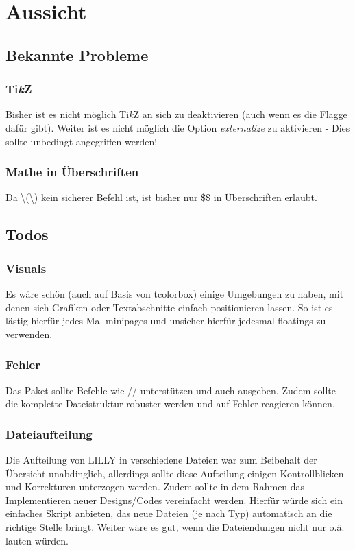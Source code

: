 \chapter{Aussicht}
\section{Bekannte Probleme}
\subsection{Ti\emph{k}Z}
Bisher ist es nicht möglich Ti\emph{k}Z an sich zu deaktivieren (auch wenn es die Flagge dafür gibt). \textcolor{Awesome}{Weiter ist es nicht möglich die Option \emph{externalize} zu aktivieren} - Dies sollte unbedingt angegriffen werden!
\subsection{Mathe in Überschriften}
Da \dq\textbackslash(\textbackslash)\dq{} kein sicherer Befehl ist, ist bisher nur \dq\$\$\dq{} in Überschriften erlaubt.
\section{Todos}
\subsection{Visuals}
Es wäre schön (auch auf Basis von tcolorbox) einige Umgebungen zu haben, mit denen sich Grafiken oder Textabschnitte einfach positionieren lassen. So ist es lästig hierfür jedes Mal minipages und unsicher hierfür jedesmal floatings zu verwenden.
\subsection{Fehler}
Das Paket sollte Befehle wie // unterstützen und auch ausgeben. Zudem sollte die komplette Dateistruktur robuster werden und auf Fehler reagieren können.
\subsection{Dateiaufteilung}
Die Aufteilung von LILLY in verschiedene Dateien war zum Beibehalt der Übersicht unabdinglich, allerdings sollte diese Aufteilung einigen Kontrollblicken und Korrekturen unterzogen werden. Zudem sollte in dem Rahmen das Implementieren neuer Designs/Codes vereinfacht werden. Hierfür würde sich ein einfaches Skript anbieten, das neue Dateien (je nach Typ) automatisch an die richtige Stelle bringt. Weiter wäre es gut, wenn die Dateiendungen nicht nur  o.ä. lauten würden.
